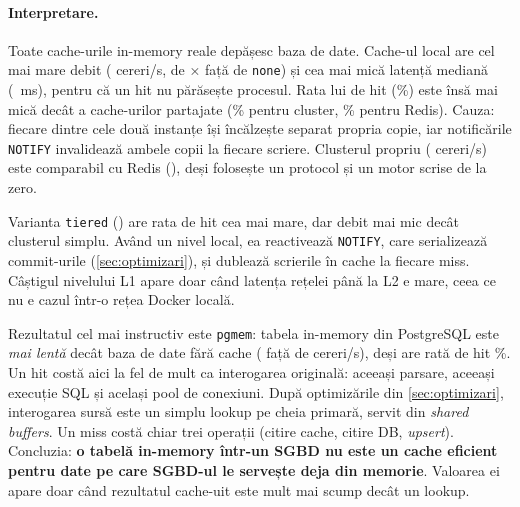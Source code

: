 \paragraph{Interpretare.} Toate cache-urile in-memory reale depășesc baza de date. Cache-ul local
are cel mai mare debit ( cereri/s, de × față de \texttt{none}) și cea mai
mică latență mediană (~ms), pentru că un hit nu părăsește procesul. Rata lui de hit
(\%) este însă mai mică decât a cache-urilor partajate (\% pentru cluster,
\% pentru Redis). Cauza: fiecare dintre cele două instanțe își încălzește separat propria copie,
iar notificările \texttt{NOTIFY} invalidează ambele copii la fiecare scriere. Clusterul propriu
( cereri/s) este comparabil cu Redis (), deși folosește un protocol și un
motor scrise de la zero.

Varianta \texttt{tiered} () are rata de hit cea mai mare, dar debit mai mic decât clusterul
simplu. Având un nivel local, ea reactivează \texttt{NOTIFY}, care serializează commit-urile
(\cref{sec:optimizari}), și dublează scrierile în cache la fiecare miss. Câștigul nivelului L1 apare doar
când latența rețelei până la L2 e mare, ceea ce nu e cazul într-o rețea Docker locală.

Rezultatul cel mai instructiv este \texttt{pgmem}: tabela in-memory din PostgreSQL este \emph{mai lentă} decât
baza de date fără cache ( față de  cereri/s), deși are rată de hit
\%. Un hit costă aici la fel de mult ca interogarea originală: aceeași parsare, aceeași
execuție SQL și același pool de conexiuni. După optimizările din \cref{sec:optimizari}, interogarea sursă
este un simplu lookup pe cheia primară, servit din \emph{shared buffers}. Un miss costă chiar trei operații
(citire cache, citire DB, \emph{upsert}). Concluzia: \textbf{o tabelă in-memory într-un SGBD nu este un cache
eficient pentru date pe care SGBD-ul le servește deja din memorie}. Valoarea ei apare doar când rezultatul
cache-uit este mult mai scump decât un lookup.
